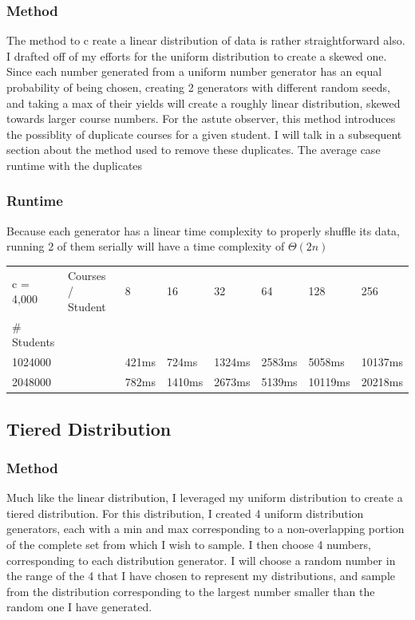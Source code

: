 \documentclass[11pt]{article}
\begin{document}
        \subsubsection{Method}
            The method to c reate a linear distribution of data is rather straightforward also. I drafted off of my efforts for the uniform distribution to create a skewed one. Since each number generated from a uniform number generator has an equal probability of being chosen, creating 2 generators with different random seeds, and taking a max of their yields will create a roughly linear distribution, skewed towards larger course numbers. For the astute observer, this method introduces the possiblity of duplicate courses for a given student. I will talk in a subsequent section about the method used to remove these duplicates. The average case runtime with the duplicates 
        \subsubsection{Runtime}
             Because each generator has a linear time complexity to properly shuffle its data, running 2 of them serially will have a time complexity of $\Theta(2n)$
	\begin{table}[h!]
	\begin{tabular}{llllllll}
	c = 4,000   & Courses / Student & 8    & 16   & 32   & 64   & 128  & 256  \\
	\# Students &            



       &        &       &       &       &       &       \\
	1024000         &                   & 421ms & 724ms  & 1324ms & 2583ms & 5058ms  & 10137ms \\
	2048000         &                   & 782ms  & 1410ms & 2673ms & 5139ms & 10119ms & 20218ms \\
	\end{tabular}
	\end{table}
    \subsection{Tiered Distribution}
        \subsubsection{Method}
             Much like the linear distribution, I leveraged my uniform distribution to create a tiered distribution. For this distribution, I created 4 uniform distribution generators, each with a min and max corresponding to a non-overlapping portion of the complete set from which I wish to sample. I then choose 4 numbers, corresponding to each distribution generator. I will choose a random number in the range of the 4 that I have chosen to represent my distributions, and sample from the distribution corresponding to the largest number smaller than the random one I have generated. 
\end{document}
